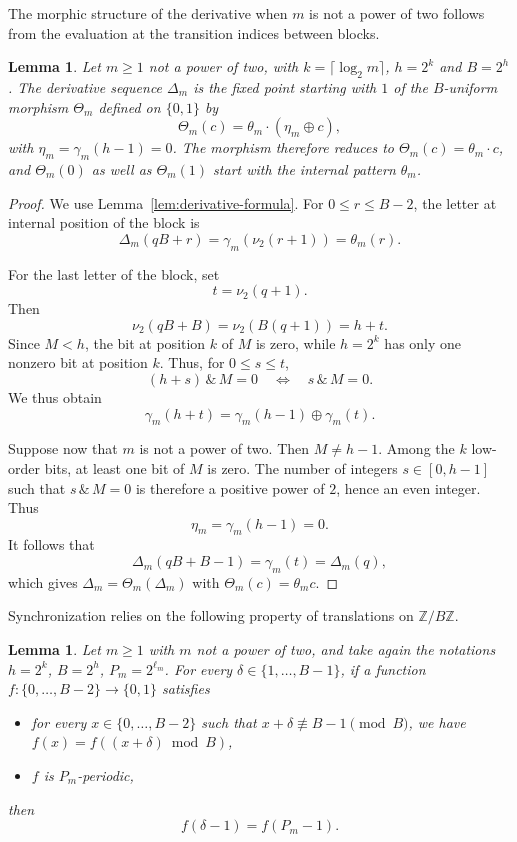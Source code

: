 \documentclass[12pt,reqno]{article}
\theoremstyle{plain}
\newtheorem{lemma}[theorem]{Lemma}
\theoremstyle{definition}
\begin{document}
The morphic structure of the derivative when $m$ is not a power of two follows from the evaluation at the transition indices between blocks.

\begin{lemma}
\label{lem:transition-morphic}
Let $m \ge 1$ not a power of two, with $k = \lceil \log_2 m \rceil$, $h = 2^k$ and $B = 2^h$. The derivative sequence $\Delta_m$ is the fixed point starting with $1$ of the $B$-uniform morphism $\Theta_m$ defined on $\{0,1\}$ by
\[
  \Theta_m(c) = \theta_m \cdot (\eta_m \oplus c),
\]
with $\eta_m = \gamma_m(h-1) = 0$. The morphism therefore reduces to $\Theta_m(c) = \theta_m \cdot c$, and $\Theta_m(0)$ as well as $\Theta_m(1)$ start with the internal pattern $\theta_m$.
\end{lemma}

\begin{proof}
We use Lemma~\ref{lem:derivative-formula}. For $0 \le r \le B - 2$, the letter at internal position of the block is
\[
  \Delta_m(qB + r) = \gamma_m(\nu_2(r + 1)) = \theta_m(r).
\]

For the last letter of the block, set
\[
  t = \nu_2(q + 1).
\]
Then
\[
  \nu_2(qB + B) = \nu_2(B(q + 1)) = h + t.
\]
Since $M < h$, the bit at position $k$ of $M$ is zero, while $h = 2^k$ has only one nonzero bit at position $k$. Thus, for $0 \le s \le t$,
\[
  (h + s) \,\&\, M = 0 \quad\Longleftrightarrow\quad s \,\&\, M = 0.
\]
We thus obtain
\[
  \gamma_m(h + t) = \gamma_m(h - 1) \oplus \gamma_m(t).
\]

Suppose now that $m$ is not a power of two. Then $M \ne h - 1$. Among the $k$ low-order bits, at least one bit of $M$ is zero. The number of integers $s \in [0, h - 1]$ such that $s \,\&\, M = 0$ is therefore a positive power of $2$, hence an even integer. Thus
\[
  \eta_m = \gamma_m(h - 1) = 0.
\]
It follows that
\[
  \Delta_m(qB + B - 1) = \gamma_m(t) = \Delta_m(q),
\]
which gives $\Delta_m = \Theta_m(\Delta_m)$ with $\Theta_m(c) = \theta_m c$.
\end{proof}

Synchronization relies on the following property of translations on $\mathbb{Z} / B \mathbb{Z}$.

\begin{lemma}
\label{lem:translation-perforee}
Let $m \ge 1$ with $m$ not a power of two, and take again the notations $h = 2^k$, $B = 2^h$, $P_m = 2^{\ell_m}$. For every $\delta \in \{1, \dots, B - 1\}$, if a function $f \colon \{0, \dots, B - 2\} \to \{0, 1\}$ satisfies
\begin{itemize}
  \item[\rm(i)] for every $x \in \{0, \dots, B - 2\}$ such that $x + \delta \not\equiv B - 1 \pmod B$, we have $f(x) = f((x + \delta) \bmod B)$,
  \item[\rm(ii)] $f$ is $P_m$-periodic,
\end{itemize}
then
\[
  f(\delta - 1) = f(P_m - 1).
\]
\end{lemma}
\end{document}

